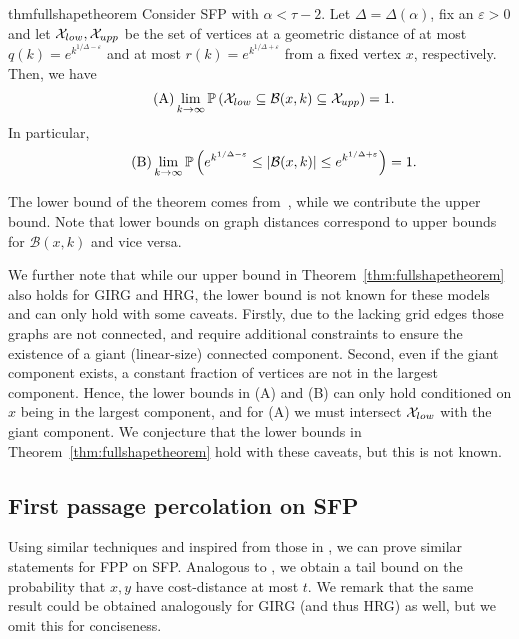 \documentclass[11pt, letterpaper, margin=1in]{amsart}
\theoremstyle{definition}
\theoremstyle{remark}
\renewcommand{\Pr}[1]{\ensuremath{\mathbb{P} \left(#1 \right) }}
\newcommand{\eps}{\varepsilon}
\newcommand{\alphaparam}{\alpha}
\newcommand{\tauparam}{\tau}
\numberwithin{equation}{section}
\begin{document}
\newcommand{\shapeEqTitle}{A}
\newcommand{\sizeEqTitle}{B}
\begin{restatable}{thm}{fullshapetheorem}\label{thm:fullshapetheorem}
    Consider SFP with $\alphaparam < \tauparam - 2$. Let $\Delta = \Delta(\alpha)$, fix an $\eps > 0$ and let $\mathcal{X}_{low}{}, \mathcal{X}_{upp}{}$ be the set of vertices at a geometric distance of at most $q(k) = e^{k^{1/\Delta - \eps}}$ and at most $r(k) = e^{k^{1/\Delta + \eps}}$ from a fixed vertex $x$, respectively. Then, we have
    \begin{align*}
      \tag{\shapeEqTitle{}}
      \lim_{k \to \infty} \Pr{\nearvertices{} \subseteq \mathcal{B}(x, k) \subseteq \farvertices{}} = 1.
    \end{align*}
    In particular, 
    \begin{align*}
      \tag{\sizeEqTitle{}}
      \lim_{k\to\infty} \Pr{e^{k^{1/\Delta - \eps}} \le |\mathcal{B}(x, k)| \le e^{k^{1/\Delta + \eps}}} = 1.
    \end{align*}
\end{restatable}

The lower bound of the theorem comes from~\cite{Biskup_2011}, while we contribute the upper bound. Note that lower bounds on graph distances correspond to upper bounds for $\mathcal{B}(x, k)$ and vice versa. 

We further note that while our upper bound in Theorem~\ref{thm:fullshapetheorem} also holds for GIRG and HRG, the lower bound is not known for these models and can only hold with some caveats. Firstly, due to the lacking grid edges those graphs are not connected, and require additional constraints to ensure the existence of a giant (linear-size) connected component. Second, even if the giant component exists, a constant fraction of vertices are not in the largest component. Hence, the lower bounds in (\shapeEqTitle{}) and (\sizeEqTitle{}) can only hold conditioned on $x$ being in the largest component, and for (\shapeEqTitle{}) we must intersect $\mathcal{X}_{low}$ with the giant component. We conjecture that the lower bounds in Theorem~\ref{thm:fullshapetheorem} hold with these caveats, but this is not known.

\subsection{First passage percolation on SFP}

Using similar techniques and inspired from those in \cite{completeFPP}, we can prove similar statements for FPP on SFP. Analogous to , we obtain a tail bound on the probability that $x,y$ have cost-distance at most $t$. We remark that the same result could be obtained analogously for GIRG (and thus HRG) as well, but we omit this for conciseness. 
\end{document}
